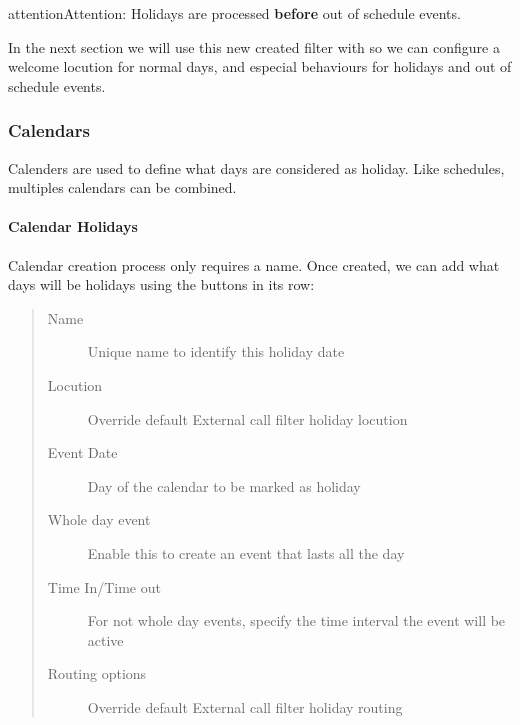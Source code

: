 \documentclass[letterpaper,10pt,english]{sphinxmanual}
\begin{document}
\begin{notice}{attention}{Attention:}
Holidays are processed \textbf{before} out of schedule events.
\end{notice}

In the next section we will use this new created filter with
{\hyperref[administration_portal/brand/views/ddis:ddis]{}} so we can configure a welcome locution for normal days,
and especial behaviours for holidays and out of schedule events.


\subsubsection{Calendars}
\label{administration_portal/client/vpbx/routing_tools/calendars:calendars}\label{administration_portal/client/vpbx/routing_tools/calendars::doc}\label{administration_portal/client/vpbx/routing_tools/calendars:id1}
Calenders are used to define what days are considered as holiday. Like
schedules, multiples calendars can be combined.


\paragraph{Calendar Holidays}
\label{administration_portal/client/vpbx/routing_tools/calendars:calendar-holidays}
Calendar creation process only requires a name. Once created, we can add what
days will be holidays using the buttons in its row:
\begin{quote}
\begin{description}
\item[{Name}] \leavevmode
Unique name to identify this holiday date

\item[{Locution}] \leavevmode
Override default External call filter holiday locution

\item[{Event Date}] \leavevmode
Day of the calendar to be marked as holiday

\item[{Whole day event}] \leavevmode
Enable this to create an event that lasts all the day

\item[{Time In/Time out}] \leavevmode
For not whole day events, specify the time interval the event will be active

\item[{Routing options}] \leavevmode
Override default External call filter holiday routing

\end{description}
\end{quote}
\end{document}
